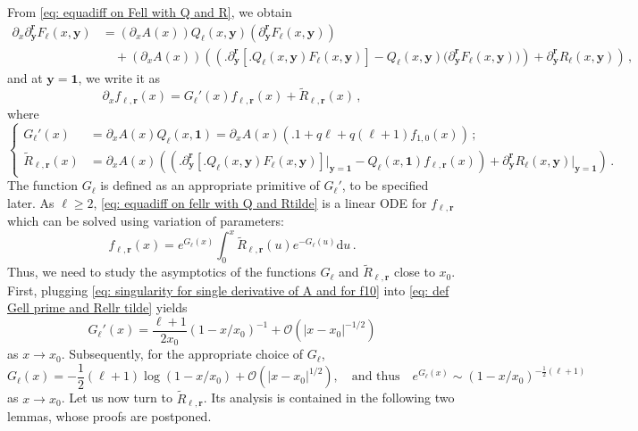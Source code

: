 \documentclass{article}
\theoremstyle{remark}
\newcommand{\cO}{\mathcal{O}}
\newcommand{\abs}[1]{{\left|#1\right|}}
\newcommand{\wR}{\widetilde{R}}
\newcommand{\by}{{\mathbf{y}}}
\newcommand{\br}{{\mathbf{r}}}
\begin{document}
From \eqref{eq: equadiff on Fell with Q and R}, we obtain
\begin{align*}
    \partial_x \partial_\by^\br F_\ell(x,\by) &= 
    (\partial_x A(x)) Q_\ell(x,\by) (\partial_\by^\br F_\ell(x,\by))
    \\&\quad + (\partial_x A(x)) \left( 
    \left(\Big. \partial_\by^\br \left[\big. Q_\ell(x,\by) F_\ell(x,\by) \right]
    - Q_\ell(x,\by) \big(\partial_\by^\br F_\ell(x,\by)\big) \right)
    + \partial_\by^\br R_\ell(x,\by)
    \right) \,,
\end{align*}
and at $\by=\bm{1}$, we write it as
\begin{equation}\label{eq: equadiff on fellr with Q and Rtilde}
    \partial_x f_{\ell,\br}(x)
    = G_\ell'(x) f_{\ell,\br}(x)
    + \wR_{\ell,\br}(x)\,,
\end{equation}
where 
\begin{equation}\label{eq: def Gell prime and Rellr tilde}
\begin{cases}
    G_\ell'(x) &= \partial_x A(x) Q_\ell(x,\bm{1}) = \partial_x A(x) \left(\big. 1 + q\ell + q(\ell+1)f_{1,0}(x) \right) \,;\\
    \wR_{\ell,\br}(x) &= \partial_x A(x) \left( 
    \left(\Big. \partial_\by^\br {\left[\big. Q_\ell(x,\by) F_\ell(x,\by) \right]}\vert_{\by=\bm{1}}
    - Q_\ell(x,\bm{1}) f_{\ell,\br}(x) \right)
    + \partial_\by^\br R_\ell(x,\by)\vert_{\by=\bm{1}}
    \right) \,.
\end{cases}
\end{equation}
The function $G_\ell$ is defined as an appropriate primitive of $G_\ell'$, to be specified later.
As $\ell\ge2$, \eqref{eq: equadiff on fellr with Q and Rtilde} is a linear ODE for $f_{\ell,\br}$ which can be solved  using variation of parameters:
\begin{equation}\label{eq: solution fellr with variation of constant}
    f_{\ell,\br}(x) = e^{G_\ell(x)} \int_0^x \wR_{\ell,\br}(u) e^{-G_\ell(u)} \mathrm{d}u \,.
\end{equation}
Thus, we need to study the asymptotics of the functions $G_\ell$ and $\wR_{\ell,\br}$ close to $x_0$.
First, plugging \eqref{eq: singularity for single derivative of A and for f10} into \eqref{eq: def Gell prime and Rellr tilde} yields
\begin{equation*}
    G_\ell'(x) = \frac{\ell+1}{2x_0} (1-x/x_0)^{-1}
    + \cO\left( \abs{x-x_0}^{-1/2} \right)
\end{equation*}
as $x\to x_0$.
Subsequently, for the appropriate choice of $G_\ell$,
\begin{equation}\label{ eq: singularity for expGell}
    G_\ell(x) = -\frac12(\ell+1) \log(1-x/x_0) + \cO\left( \abs{x-x_0}^{1/2} \right),
    \quad\text{and thus}\quad
    e^{G_\ell(x)} \sim (1-x/x_0)^{-\frac12(\ell+1)}
\end{equation}
as $x\to x_0$.
Let us now turn to $\wR_{\ell,\br}$.
Its analysis is contained in the following two lemmas, whose proofs are postponed.
\end{document}
